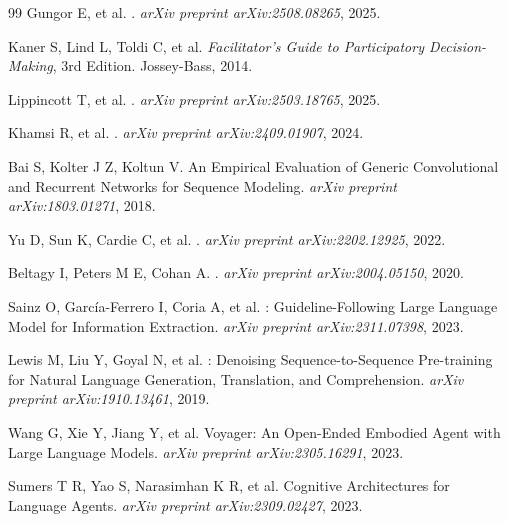\documentclass[12pt,a4paper]{ctexart}
\begin{document}
\begin{thebibliography}{99}
Gungor E, et al.
.
\newblock \emph{arXiv preprint arXiv:2508.08265}, 2025.

Kaner S, Lind L, Toldi C, et al.
\newblock \emph{Facilitator's Guide to Participatory Decision-Making}, 3rd Edition.
\newblock Jossey-Bass, 2014.

Lippincott T, et al.
.
\newblock \emph{arXiv preprint arXiv:2503.18765}, 2025.

Khamsi R, et al.
.
\newblock \emph{arXiv preprint arXiv:2409.01907}, 2024.

Bai S, Kolter J Z, Koltun V.
\newblock An Empirical Evaluation of Generic Convolutional and Recurrent Networks for Sequence Modeling.
\newblock \emph{arXiv preprint arXiv:1803.01271}, 2018.

Yu D, Sun K, Cardie C, et al.
.
\newblock \emph{arXiv preprint arXiv:2202.12925}, 2022.

Beltagy I, Peters M E, Cohan A.
.
\newblock \emph{arXiv preprint arXiv:2004.05150}, 2020.

Sainz O, Garc{\'i}a-Ferrero I, Coria A, et al.
: Guideline-Following Large Language Model for Information Extraction.
\newblock \emph{arXiv preprint arXiv:2311.07398}, 2023.

Lewis M, Liu Y, Goyal N, et al.
: Denoising Sequence-to-Sequence Pre-training for Natural Language Generation, Translation, and Comprehension.
\newblock \emph{arXiv preprint arXiv:1910.13461}, 2019.

Wang G, Xie Y, Jiang Y, et al.
\newblock Voyager: An Open-Ended Embodied Agent with Large Language Models.
\newblock \emph{arXiv preprint arXiv:2305.16291}, 2023.

Sumers T R, Yao S, Narasimhan K R, et al.
\newblock Cognitive Architectures for Language Agents.
\newblock \emph{arXiv preprint arXiv:2309.02427}, 2023.


\end{thebibliography}
\end{document}
